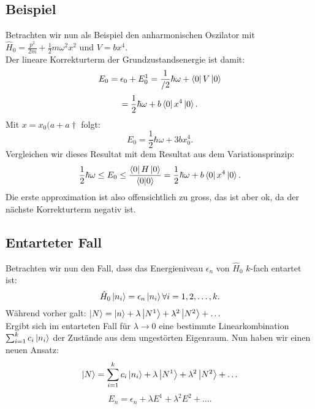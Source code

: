 \documentclass{report}
\begin{document}
\subsection{Beispiel}
Betrachten wir nun als Beispiel den anharmonischen Oszilator mit $\hat{H}_0 = \frac{p^2}{2m} + \frac{1}{2}m\omega^2x^2$ und $V = bx^4$.\\
Der lineare Korrekturterm der Grundzustandsenergie ist damit: \[
E_0 = \epsilon_0 + E_0^1 = \frac{1}{/2} \hbar \omega + \bra{0} V \ket{0} 
\] \[
= \frac{1}{2}\hbar \omega + b \bra{0} x^4 \ket{0} 
.\] Mit $x = x_0(a + a\dagger$ folgt: \[
E_0 = \frac{1}{2}\hbar \omega + 3 b x_0^4
.\] Vergleichen wir dieses Resultat mit dem Resultat aus dem Variationsprinzip: \[
\frac{1}{2}\hbar \omega \le E_0 \le  \frac{\bra{0} H \ket{0} }{\bra{0} \ket{0} } = \frac{1}{2}\hbar\omega + b \bra{0} x^4 \ket{0} 
.\] Die erste approximation ist also offensichtlich zu gross, das ist aber ok, da der nächste Korrekturterm negativ ist. \\
\subsection{Entarteter Fall}
Betrachten wir nun den Fall, dass das Energieniveau $\epsilon_n$ von $\hat{H}_0$ $k$-fach entartet ist: \[
\hat{H}_0 \ket{n_i} = \epsilon_n \ket{n_i} \forall i = 1,2,\ldots,k
.\]  Während vorher galt: $\ket{N} = \ket{n} + \lambda \ket{N^1} + \lambda^2 \ket{N^2} + \ldots $ \\
Ergibt sich im entarteten Fall für $\lambda \to 0$ eine bestimmte Linearkombination $\sum_{i=1}^{k} c_i \ket{n_i}$ der Zustände aus dem ungestörten Eigenraum. Nun haben wir einen neuen Ansatz: \[
\ket{N}  = \sum_{i = 1}^{k} c_i \ket{n_i} +\lambda \ket{N^1}  + \lambda^2 \ket{N^2} + \ldots
\] \[
E_n = \epsilon_n + \lambda E^1 + \lambda^2 E^2 + \ldots
.\]  
\end{document}
